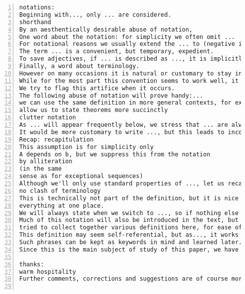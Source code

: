 \documentclass[11pt]{amsart}
\begin{document}
\begin{lstlisting}[numbers=left,numberstyle=\tiny,numbersep=10pt]
notations:
Beginning with..., only ... are considered.
shorthand
By an aesthentically desirable abuse of notation, 
One word about the notation: for simplicity we often omit ...
For notational reasons we usually extend the ... to (negative indices) by defining ...
The term ... is a convenient, but temporary, expedient.
To save adjectives, if ... is described as ..., it is implicitly assumed to be ...
Finally, a word about terminology.
However on many occasions it is natural or customary to stay in ... mode when nonetheless one has ... in mind.
While for the most part this convention seems to work well, it occasionally leads us to make extraneous ... hypotheses in order to invoke ...
We try to flag this artifice when it occurs.
The following abuse of notation will prove handy:...
we can use the same definition in more general contexts, for example, ...
allow us to state theorems more succinctly
clutter notation
As ... will appear frequently below, we stress that ... are always ... for us.
It would be more customary to write ..., but this leads to inconsistent notation.
Recap: recapitulation
This assumption is for simplicity only
A depends on b, but we suppress this from the notation
by alliteration
(in the same
sense as for exceptional sequences)
Although we'll only use standard properties of ..., let us recall a few definitions for the comfort of the reader.
no clash of terminology
This is technically not part of the definition, but it is nice to have
everything at one place.
We will always state when we switch to ..., so if nothing else is said ... is the one that is used.
Much of this notation will also be introduced in the text, but I have
tried to collect together various definitions here, for ease of reading.
This definition may seem self-referential, but as..., it works by induction on...(with... as the base case)
Such phrases can be kept as keywords in mind and learned later.
Since this is the main subject of study of this paper, we have decided to spent this section to explicitly set-up all the notation that we will use later.

thanks:
warm hospitality
Further comments, corrections and suggestions are of course more than welcome.


\end{lstlisting}
\end{document}
